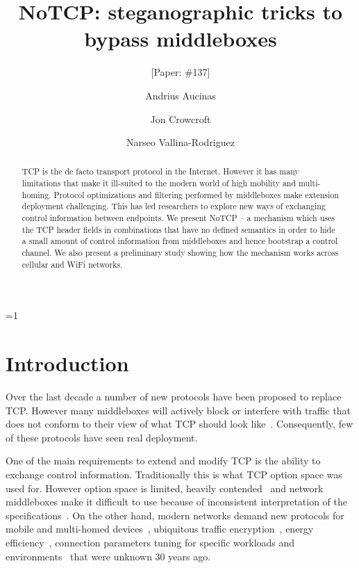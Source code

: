 \documentclass{sig-alternate-10pt}
\def\anon{1}        %
\begin{document}
\date{}


\title{NoTCP: steganographic tricks to bypass middleboxes}
\ifnum\anon=1
\author{[Paper: \#137]}%
\else
{}
\author{
\alignauthor Andrius Aucinas\\
\and
\alignauthor Jon Crowcroft\\
\and
\alignauthor Narseo Vallina-Rodriguez\\
}
\fi

    
\maketitle
\begin{abstract}
TCP is the de facto transport protocol in the Internet. However it has many limitations that make it ill-suited to the modern world of high mobility and multi-homing. Protocol optimizations and filtering performed by middleboxes make extension deployment challenging. This has led researchers to explore new ways of exchanging control information between endpoints. We present NoTCP -- a mechanism which uses the TCP header fields in combinations that have no defined semantics in order to hide a small amount of control information from middleboxes and hence bootstrap a control channel. We also present a preliminary study showing how the mechanism works across cellular and WiFi networks.
\end{abstract} 

\section{Introduction}
\label{section:intro}

Over the last decade a number of new protocols have been proposed to replace TCP. However many middleboxes will actively block or interfere with traffic that does not conform to their view of what TCP should look like~\cite{Handley:2001vp,Vutukuru:2008fc,Guha2005tb}. Consequently, few of these protocols have seen real deployment.

One of the main requirements to extend and modify TCP is the ability to exchange control information. Traditionally this is what TCP option space was used for. However option space is limited, heavily contended~\cite{Handley:vj,Mazieres:uz} and network middleboxes make it difficult to use because of inconsistent interpretation of the specifications~\cite{Honda,Guha2005tb,UntoldMiddlebox2011}. On the other hand, modern networks demand new protocols for mobile and multi-homed devices~\cite{Mazieres:uz}, ubiquitous traffic encryption~\cite{Handley:vj,Rescorla:R080FoGB}, energy efficiency~\cite{Aucinas:2013uk}, connection parameters tuning for specific workloads and environments~\cite{Dukkipati:2010hs,Erman:2013uz} that were unknown 30 years ago.
\end{document}

